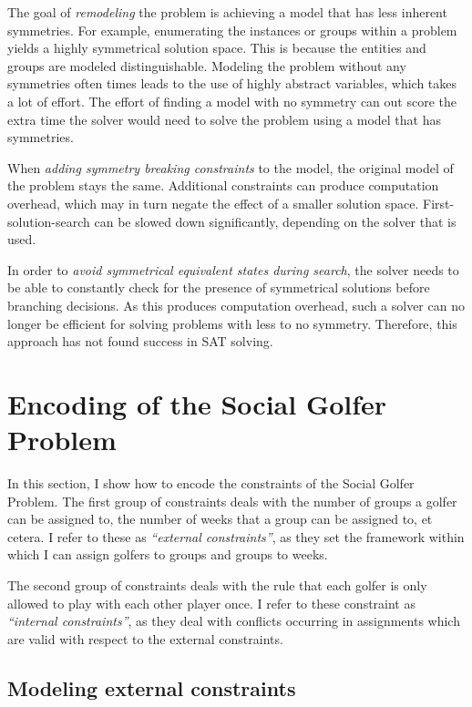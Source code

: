 \documentclass[a4paper]{scrartcl}
\begin{document}
The goal of \emph{remodeling} the problem is achieving a model that has less inherent symmetries. For example, enumerating the instances or groups within a problem yields a highly symmetrical solution space. This is because the entities and groups are modeled distinguishable. Modeling the problem without any symmetries often times leads to the use of highly abstract variables, which takes a lot of effort. The effort of finding a model with no symmetry can out score the extra time the solver would need to solve the problem using a model that has symmetries.

When \emph{adding symmetry breaking constraints} to the model, the original model of the problem stays the same. Additional constraints can produce computation overhead, which may in turn negate the effect of a smaller solution space. First-solution-search can be slowed down significantly, depending on the solver that is used\cite{Prestwich}.

In order to \emph{avoid symmetrical equivalent states during search}, the solver needs to be able to constantly check for the presence of symmetrical solutions before branching decisions. As this produces computation overhead, such a solver can no longer be efficient for solving problems with less to no symmetry. Therefore, this approach has not found success in SAT solving.

\section{Encoding of the Social Golfer Problem}

In this section, I show how to encode the constraints of the Social Golfer Problem. The first group of constraints deals with the number of groups a golfer can be assigned to, the number of weeks that a group can be assigned to, et cetera. I refer to these as \emph{``external constraints''}, as they set the framework within which I can assign golfers to groups and groups to weeks.

The second group of constraints deals with the rule that each golfer is only allowed to play with each other player once. I refer to these constraint as \emph{``internal constraints''}, as they deal with conflicts occurring in assignments which are valid with respect to the external constraints.


\subsection{Modeling external constraints}
\end{document}
